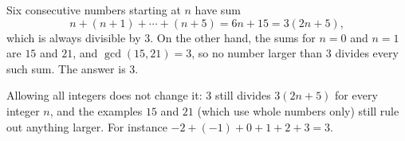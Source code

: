 Six consecutive numbers starting at $n$ have sum
\[n+(n+1)+\cdots+(n+5)=6n+15=3(2n+5),\]
which is always divisible by $3$. On the other hand, the sums for $n=0$ and $n=1$ are $15$ and $21$, and $\gcd(15,21)=3$, so no number larger than $3$ divides every such sum. The answer is $\boxed{3}$.

Allowing all integers does not change it: $3$ still divides $3(2n+5)$ for every integer $n$, and the examples $15$ and $21$ (which use whole numbers only) still rule out anything larger. For instance $-2+(-1)+0+1+2+3=3$.
